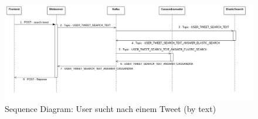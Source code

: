 \begin{figure}[htbp!]
	\centering
	\includegraphics[width=\textwidth]{pics/useCases/SearchTweet}
	\caption{Sequence Diagram: User sucht nach einem Tweet (by text)}
\end{figure}
